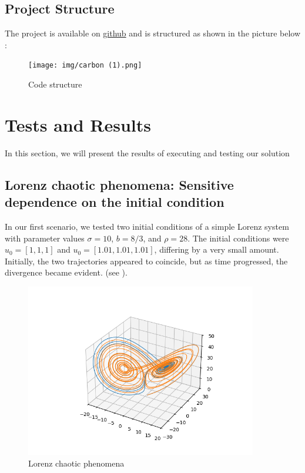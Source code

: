 \documentclass[a4paper,12pt,french]{article}
\begin{document}
\subsection{Project Structure}
The project is available on  \href{https://github.com/master-csmi/2024-m1-parareal}{github} and is structured as shown in the picture below :
\newpage

\begin{figure}[ht!]
    \centering
    \texttt{[image: img/carbon (1).png]}
    \caption{Code structure}
    \label{fig:7}
\end{figure}
\newline

\section{Tests and Results}
In this section, we will present the results of executing and testing our solution
\subsection{Lorenz chaotic phenomena: Sensitive dependence on the initial condition}
In our first scenario, we tested two initial conditions of a simple Lorenz system with parameter values \(\sigma = 10\), \(b = 8/3\), and \(\rho = 28\). The initial conditions were \(u_0 = [1, 1, 1]\) and \(u_0 = [1.01, 1.01, 1.01]\), differing by a very small amount. Initially, the two trajectories appeared to coincide, but as time progressed, the divergence became evident. (see ).

\begin{figure}[ht!]
    \centering
    \includegraphics[width=0.9\textwidth]{img/Figure_1.png}
    \caption{Lorenz chaotic phenomena}
    \label{fig:4}
\end{figure}
\newpage
\end{document}
